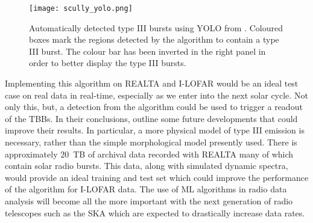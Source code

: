 \begin{figure}[ht]
\centering
\texttt{[image: scully\_yolo.png]}
\caption[Automatically detected type III bursts using YOLO.]{Automatically detected type III bursts using YOLO from \cite{Scully2021}. Coloured boxes mark the regions detected by the algorithm to contain a type III burst. The colour bar has been inverted in the right panel in order to better display the type III bursts.}
\label{fig:yolo}
\end{figure}

Implementing this algorithm on REALTA and I-LOFAR would be an ideal test case on real data in real-time, especially as we enter into the next solar cycle. Not only this, but, a detection from the algorithm could be used to trigger a readout of the TBBs.
In their conclusions, \cite{Scully2021} outline some future developments that could improve their results. In particular, a more physical model of type III emission is necessary, rather than the simple morphological model presently used. There is approximately 20~TB of archival data recorded with REALTA many of which contain solar radio bursts. This data, along with simulated dynamic spectra, would provide an ideal training and test set which could improve the performance of the algorithm for I-LOFAR data. The use of ML algorithms in radio data analysis will become all the more important with the next generation of radio telescopes such as the SKA which are expected to drastically increase data rates.

